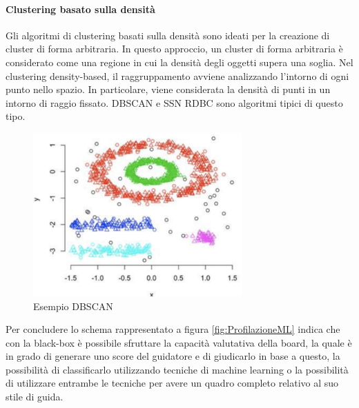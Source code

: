 \documentclass[12pt, a4paper, italian]{report}
\numberwithin{figure}{chapter}
\numberwithin{table}{chapter}
\begin{document}
\paragraph{Clustering basato sulla densità}
Gli algoritmi di clustering basati sulla densità sono ideati per la creazione di cluster di forma arbitraria. In questo approccio, un cluster di forma arbitraria è considerato come una regione in cui la densità degli oggetti supera una soglia. Nel clustering density-based, il raggruppamento avviene analizzando l'intorno di ogni punto nello spazio. In particolare, viene considerata la densità di punti in un intorno di raggio fissato. DBSCAN e SSN RDBC sono algoritmi tipici di questo tipo.

\begin{figure}[h] \centering
\includegraphics[width=8cm]{C_Density.png}
\caption{Esempio DBSCAN\protect\footnotemark}
\label{fig:density clustering}
\end{figure}

\vspace{2cm}
Per concludere lo schema rappresentato a figura \ref{fig:ProfilazioneML} indica che con la black-box è possibile sfruttare la capacità valutativa della board, la quale è in grado di generare uno score del guidatore e di giudicarlo in base a questo, la possibilità di classificarlo utilizzando tecniche di machine learning o la possibilità di utilizzare entrambe le tecniche per avere un quadro completo relativo al suo stile di guida.
\end{document}
